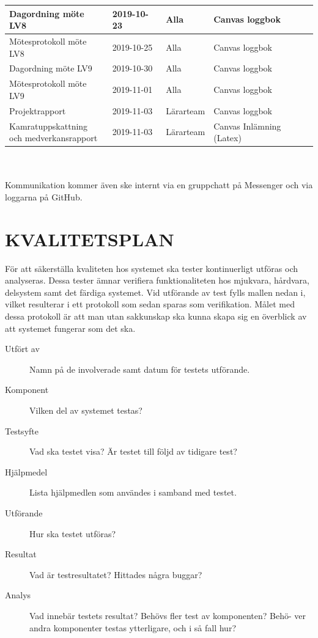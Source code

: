 \documentclass[a4paper]{article}
\begin{document}
\begin{tabular}{|l|l|l|l|}
Dagordning möte LV8 & 2019-10-23 & Alla & Canvas loggbok \\ \hline
Mötesprotokoll möte LV8 & 2019-10-25 & Alla & Canvas loggbok \\ \hline

Dagordning möte LV9 & 2019-10-30 & Alla & Canvas loggbok \\ \hline
Mötesprotokoll möte LV9 & 2019-11-01 & Alla & Canvas loggbok \\ \hline
Projektrapport & 2019-11-03 & Lärarteam & Canvas loggbok \\ \hline
\pbox{20cm}{Kamratuppskattning \\ och medverkansrapport} & 2019-11-03 & Lärarteam & Canvas Inlämning (Latex) \\ \hline



\end{tabular}
\\ \\
Kommunikation kommer även ske internt via en gruppchatt på Messenger och via loggarna på GitHub.
\\

\section{KVALITETSPLAN}
\label{sec:kval}

För att säkerställa kvaliteten hos systemet ska tester kontinuerligt utföras och analyseras. Dessa tester ämnar verifiera funktionaliteten hos mjukvara, hårdvara, delsystem samt det färdiga systemet. Vid utförande av test fylls mallen nedan i, vilket resulterar i ett protokoll som sedan sparas som verifikation. Målet med dessa protokoll är att man utan sakkunskap ska kunna skapa sig en överblick av att systemet fungerar som det ska.

\begin{description}
	\item[Utfört av] Namn på de involverade samt datum för testets utförande.

	\item[Komponent] Vilken del av systemet testas?

	\item[Testsyfte] Vad ska testet visa? Är testet till följd av tidigare test?

	\item[Hjälpmedel] Lista hjälpmedlen som användes i samband med testet.

	\item[Utförande] Hur ska testet utföras?

	\item[Resultat] Vad är testresultatet? Hittades några buggar?

	\item[Analys] Vad innebär testets resultat? Behövs fler test av komponenten? Behö-
	ver andra komponenter testas ytterligare, och i så fall hur?
\end{description}
\end{document}
